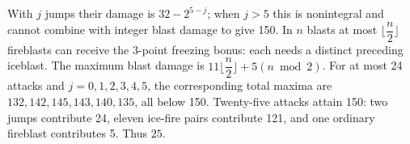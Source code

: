 With $j$ jumps their damage is $32-2^{5-j}$; when $j>5$ this is nonintegral and cannot combine with integer blast damage to give 150. In $n$ blasts at most $\lfloor\dfrac{n}{2}\rfloor$ fireblasts can receive the 3-point freezing bonus: each needs a distinct preceding iceblast. The maximum blast damage is $11\lfloor\dfrac{n}{2}\rfloor+5(n\bmod2)$. For at most 24 attacks and $j=0,1,2,3,4,5$, the corresponding total maxima are $132,142,145,143,140,135$, all below 150. Twenty-five attacks attain 150: two jumps contribute 24, eleven ice-fire pairs contribute 121, and one ordinary fireblast contributes 5. Thus $\boxed{25}$.
